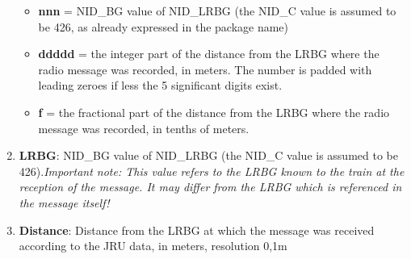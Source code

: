 \documentclass{template/openetcs_article}
\begin{document}
\begin{enumerate}
\begin{itemize}
	 \item \textbf{nnn} = NID\_BG value of NID\_LRBG (the NID\_C value is assumed to be 426, as already expressed in the package name)
	 \item \textbf{ddddd} = the integer part of the distance from the LRBG where the radio message was recorded, in meters. The number is padded with leading zeroes if less the 5 significant digits exist.
	 \item \textbf{f} = the fractional part of the distance from the LRBG where the radio message was recorded, in tenths of meters.
	 	\end{itemize}
 \item \textbf{LRBG}: NID\_BG value of NID\_LRBG (the NID\_C value is assumed to be 426).\newline\newline \emph{Important note: This value refers to the LRBG known to the train at the reception of the message. It may differ from the LRBG which is referenced in the message itself!}
 \item \textbf{Distance}: Distance from the LRBG at which the message was received according to the JRU data, in meters, resolution 0,1m
\end{enumerate}
\end{document}

